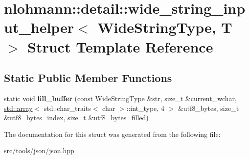 \hypertarget{structnlohmann_1_1detail_1_1wide__string__input__helper}{}\section{nlohmann\+:\+:detail\+:\+:wide\+\_\+string\+\_\+input\+\_\+helper$<$ Wide\+String\+Type, T $>$ Struct Template Reference}
\label{structnlohmann_1_1detail_1_1wide__string__input__helper}
\subsection*{Static Public Member Functions}
\begin{DoxyCompactItemize}
\item 
\mbox{\label{structnlohmann_1_1detail_1_1wide__string__input__helper_ae82d79118fa319a97e4a40568186a922}} 
static void {\bfseries fill\+\_\+buffer} (const Wide\+String\+Type \&str, size\+\_\+t \&current\+\_\+wchar, \hyperlink{namespacenlohmann_1_1detail_a1ed8fc6239da25abcaf681d30ace4985af1f713c9e000f5d3f280adbd124df4f5}{std\+::array}$<$ std\+::char\+\_\+traits$<$ char $>$\+::int\+\_\+type, 4 $>$ \&utf8\+\_\+bytes, size\+\_\+t \&utf8\+\_\+bytes\+\_\+index, size\+\_\+t \&utf8\+\_\+bytes\+\_\+filled)
\end{DoxyCompactItemize}


The documentation for this struct was generated from the following file\+:\begin{DoxyCompactItemize}
\item 
src/tools/json/json.\+hpp\end{DoxyCompactItemize}
